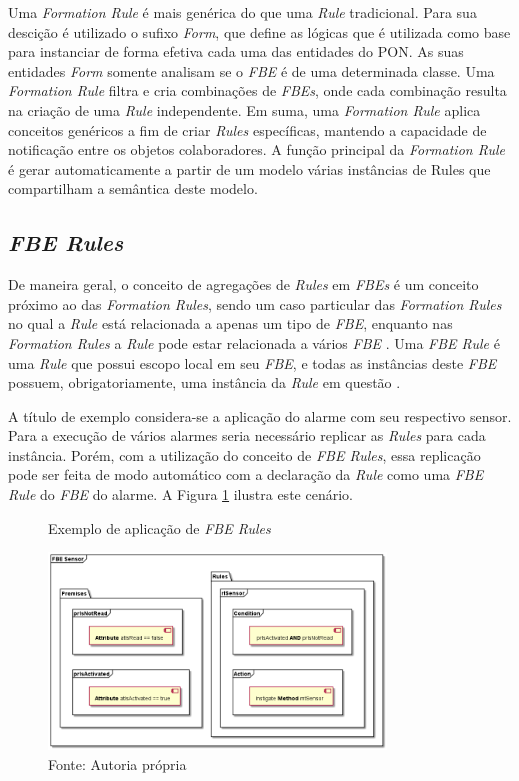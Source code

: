Uma \textit{Formation Rule} é mais genérica do que uma \textit{Rule}
tradicional. Para sua descição é utilizado o sufixo \textit{Form}, que define as
lógicas que é utilizada como base para instanciar de forma efetiva cada uma das
entidades do PON. As suas entidades \textit{Form} somente analisam se o
\textit{FBE} é de uma determinada classe. Uma \textit{Formation Rule} filtra e
cria combinações de \textit{FBEs}, onde cada combinação resulta na criação de
uma \textit{Rule} independente. Em suma, uma \textit{Formation Rule} aplica
conceitos genéricos a fim de criar \textit{Rules} específicas, mantendo a
capacidade de notificação entre os objetos colaboradores. A função principal da
\textit{Formation Rule} é gerar automaticamente a partir de um modelo várias
instâncias de Rules que compartilham a semântica deste modelo. 


\subsection{\textit{FBE Rules}}\label{sec:fbe_rule}

De maneira geral, o conceito de agregações de \textit{Rules} em \textit{FBEs} é
um conceito próximo ao das \textit{Formation Rules}, sendo um caso particular
das \textit{Formation Rules} no qual a \textit{Rule} está relacionada a apenas
um tipo de \textit{FBE}, enquanto nas \textit{Formation Rules} a \textit{Rule}
pode estar relacionada a vários \textit{FBE} \cite{msc_santos_2017}. Uma
\textit{FBE Rule} é uma \textit{Rule} que possui escopo local em seu
\textit{FBE}, e todas as instâncias deste \textit{FBE} possuem,
obrigatoriamente, uma instância da \textit{Rule} em questão
\cite{doc_ronszcka_2019}.

A título de exemplo considera-se a aplicação do alarme com seu respectivo
sensor. Para a execução de vários alarmes seria necessário replicar as
\textit{Rules} para cada instância. Porém, com a utilização do conceito de
\textit{FBE Rules}, essa replicação pode ser feita de modo automático com a
declaração da \textit{Rule} como uma \textit{FBE Rule} do \textit{FBE} do
alarme. A Figura \ref{fig:fbe_rule} ilustra este cenário.

\begin{figure}[!htb]
  \centering
  \caption{Exemplo de aplicação de \textit{FBE Rules}}
  \includegraphics[width=0.8\textwidth]{../out/diagrams/fbe_rule/rules.png}
  \smallskip
  \caption*{Fonte: Autoria própria}
  \label{fig:fbe_rule}
\end{figure}


